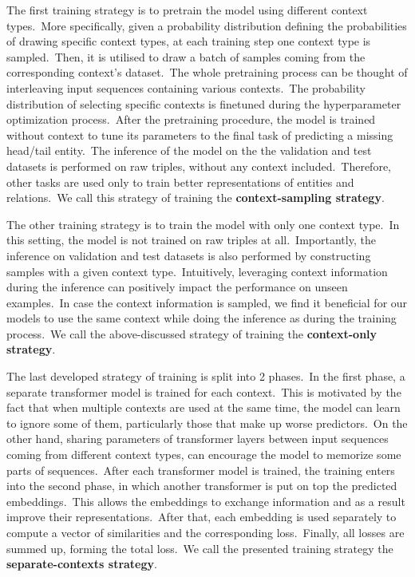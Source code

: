 \documentclass[longabstract, english, mgr]{iithesis}
\theoremstyle{default_theorem_style}\newtheorem{theorem}{Theorem}
\theoremstyle{default_theorem_style}\newtheorem{definition}{Definition}
\begin{document}
\noindent The first training strategy is to pretrain the model using different context types.\ More specifically,
given a probability distribution defining the probabilities of drawing specific context types, at each training step
one context type is sampled.\ Then, it is utilised to draw a batch of samples coming from the corresponding context's
dataset.\ The whole pretraining process can be thought of interleaving input sequences containing various
contexts.\ The probability distribution of selecting specific contexts is finetuned during the hyperparameter
optimization process.\ After the pretraining procedure, the model is trained without context to tune its parameters
to the final task of predicting a missing head/tail entity.\ The inference of the model on the the validation and test
datasets is performed on raw triples, without any context included.\ Therefore, other tasks are used only to train
better representations of entities and relations.\ We call this strategy of training the
\textbf{context-sampling strategy}.\newline

\noindent The other training strategy is to train the model with only one context type.\ In this setting, the model
is not trained on raw triples at all.\ Importantly, the inference on validation and test datasets is also performed by
constructing samples with a given context type.\ Intuitively, leveraging context information during the inference
can positively impact the performance on unseen examples.\ In case the context information is sampled, we find it
beneficial for our models to use the same context while doing the inference as during the training
process.\ We call the above-discussed strategy of training the \textbf{context-only strategy}.\newline

\noindent The last developed strategy of training is split into 2 phases.\ In the first phase, a separate transformer
model is trained for each context.\ This is motivated by the fact that when multiple contexts are used at the same
time, the model can learn to ignore some of them, particularly those that make up worse predictors.\ On the other
hand, sharing parameters of transformer layers between input sequences coming from different context types, can
encourage the model to memorize some parts of sequences.\ After each transformer model is trained, the training enters
into the second phase, in which another transformer is put on top the predicted embeddings.\ This allows the
embeddings to exchange information and as a result improve their representations.\ After that, each embedding is used
separately to compute a vector of similarities and the corresponding loss.\ Finally, all losses are summed up,
forming the total loss.\ We call the presented training strategy the \textbf{separate-contexts strategy}.
\end{document}
